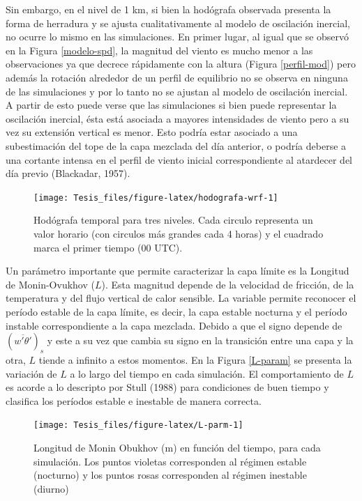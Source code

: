 \documentclass[12pt,spanish,oneside, a4paper]{book}
\begin{document}
Sin embargo, en el nivel de 1 km, si bien la hodógrafa observada
presenta la forma de herradura y se ajusta cualitativamente al modelo de
oscilación inercial, no ocurre lo mismo en las simulaciones. En primer
lugar, al igual que se observó en la Figura \ref{modelo-spd}, la
magnitud del viento es mucho menor a las observaciones ya que decrece
rápidamente con la altura (Figura \ref{perfil-mod}) pero además la
rotación alrededor de un perfil de equilibrio no se observa en ninguna
de las simulaciones y por lo tanto no se ajustan al modelo de oscilación
inercial. A partir de esto puede verse que las simulaciones si bien
puede representar la oscilación inercial, ésta está asociada a mayores
intensidades de viento pero a su vez su extensión vertical es menor.
Esto podría estar asociado a una subestimación del tope de la capa
mezclada del día anterior, o podría deberse a una cortante intensa en el
perfil de viento inicial correspondiente al atardecer del día previo
(Blackadar, 1957).

\begin{figure}

{\centering \texttt{[image: Tesis\_files/figure-latex/hodografa-wrf-1]} 

}

\caption{Hodógrafa temporal para tres niveles. Cada circulo representa un valor horario (con circulos más grandes cada 4 horas) y el cuadrado marca el primer tiempo (00 UTC). \label{hodografa-mod}}\label{fig:hodografa-wrf}
\end{figure}

Un parámetro importante que permite caracterizar la capa límite es la
Longitud de Monin-Ovukhov (\(L\)). Esta magnitud depende de la velocidad
de fricción, de la temperatura y del flujo vertical de calor sensible.
La variable permite reconocer el período estable de la capa límite, es
decir, la capa estable nocturna y el período instable correspondiente a
la capa mezclada. Debido a que el signo depende de
\((\overline{w'\theta '})_s\) y este a su vez que cambia su signo en la
transición entre una capa y la otra, \(L\) tiende a infinito a estos
momentos. En la Figura \ref{L-param} se presenta la variación de \(L\) a
lo largo del tiempo en cada simulación. El comportamiento de \(L\) es
acorde a lo descripto por Stull (1988) para condiciones de buen tiempo y
clasifica los períodos estable e inestable de manera correcta.

\begin{figure}

{\centering \texttt{[image: Tesis\_files/figure-latex/L-parm-1]} 

}

\caption{Longitud de Monin Obukhov (m) en función del tiempo, para cada simulación. Los puntos violetas corresponden al régimen estable (nocturno) y los puntos rosas corresponden al régimen inestable (diurno) \label{L-param}}\label{fig:L-parm}
\end{figure}
\end{document}
